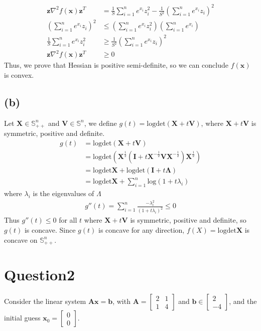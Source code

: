 \documentclass{article}
\begin{document}
\begin{align*}
    \bm{z}\nabla^2 f(\bm{x})\bm{z}^T &= \frac{1}{S}\sum_{i=1}^{n}e^{x_i}z_i^2 - \frac{1}{S^2}(\sum_{i=1}^{n}e^{x_i}z_i)^2 \\
    (\sum_{i=1}^{n}e^{x_i}z_i)^2 &\leq (\sum_{i=1}^{n}e^{x_i}z_i^2)(\sum_{i=1}^{n}e^{x_i}) \\
    \frac{1}{S}\sum_{i=1}^{n}e^{x_i}z_i^2 &\geq \frac{1}{S^2}(\sum_{i=1}^{n}e^{x_i}z_i)^2 \\
    \bm{z}\nabla^2 f(\bm{x})\bm{z}^T &\geq 0
\end{align*}
Thus, we prove that Hessian is positive semi-definite, so we can conclude \(f(\bm{x})\) is convex.

\subsection*{(b)}
Let \(\bm{X} \in \mathbb{S}_{++}^{n}\) and \(\bm{V} \in \mathbb{S}^n\), we define \(g(t) = \text{log} \text{det} (\bm{X} + t\bm{V})\), where \(\bm{X} + t\bm{V}\) is symmetric, positive and definite.
\begin{align*}
    g(t) &= \text{log} \text{det} (\bm{X} + t\bm{V}) \\
    &= \text{log} \text{det} (\bm{X}^{\frac{1}{2}}(\bm{I} + t\bm{X}^{-\frac{1}{2}} \bm{V} \bm{X}^{-\frac{1}{2}})\bm{X}^{\frac{1}{2}}) \\
    &= \text{log} \text{det} \bm{X} + \text{log} \text{det} (\bm{I} + t\bm{\Lambda}) \\
    &= \text{log} \text{det} \bm{X} + \sum_{i=1}^{n} \text{log}(1 + t\lambda_i)
\end{align*}
where \(\lambda_i\) is the eigenvalues of \(\Lambda\)
\begin{align*}
    g''(t) = \sum_{i=1}^{n} \frac{-\lambda_i^2}{(1 + t \lambda_i)^2} \leq 0
\end{align*}
Thus \(g''(t) \leq 0\) for all \(t\) where \(\bm{X} + t\bm{V}\) is symmetric, positive and definite, so \(g(t)\) is concave.
Since \(g(t)\) is concave for any direction, \(f(X) = \text{log} \text{det} \bm{X}\) is concave on \(\mathbb{S}_{++}^{n}\).





\section*{Question2}
Consider the linear system \(\bm{Ax} = \bm{b}\), with \(\bm{A} = \begin{bmatrix}
    2 & 1\\
    1 & 4
\end{bmatrix}\) and \(\bm{b} \in \begin{bmatrix}
    2 \\
    -4
\end{bmatrix}\), and the initial guess \(\bm{x}_0 = \begin{bmatrix}
    0 \\
    0
\end{bmatrix}\).
\end{document}
